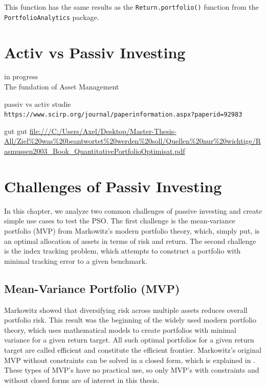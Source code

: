 \documentclass[
  oneside]{book}
\begin{document}
This function has the same results as the \texttt{Return.portfolio()} function from the \texttt{PortfolioAnalytics} package.

\hypertarget{activ-vs-passiv-investing}{%
\chapter{Activ vs Passiv Investing}\label{activ-vs-passiv-investing}}

\textbar\textbar\textbar in progress\textbar\textbar\textbar{}\\
The fundation of Asset Management

passiv vs activ studie
\texttt{https://www.scirp.org/journal/paperinformation.aspx?paperid=92983}

gut gut
\url{file:///C:/Users/Axel/Desktop/Master-Thesis-All/Ziel\%20was\%20beantwortet\%20werden\%20soll/Quellen\%20nur\%20wichtige/Rasmussen2003_Book_QuantitativePortfolioOptimisat.pdf}

\hypertarget{challenges}{%
\chapter{Challenges of Passiv Investing}\label{challenges}}

In this chapter, we analyze two common challenges of passive investing and create simple use cases to test the PSO. The first challenge is the mean-variance portfolio (MVP) from Markowitz's modern portfolio theory, which, simply put, is an optimal allocation of assets in terms of risk and return. The second challenge is the index tracking problem, which attempts to construct a portfolio with minimal tracking error to a given benchmark.

\hypertarget{mean-variance-portfolio-mvp}{%
\section{Mean-Variance Portfolio (MVP)}\label{mean-variance-portfolio-mvp}}

Markowitz showed that diversifying risk across multiple assets reduces overall portfolio risk. This result was the beginning of the widely used modern portfolio theory, which uses mathematical models to create portfolios with minimal variance for a given return target. All such optimal portfolios for a given return target are called efficient and constitute the efficient frontier. Markowitz's original MVP without constraints can be solved in a closed form, which is explained in \citep{Eric2021}. These types of MVP's have no practical use, so only MVP's with constraints and without closed forms are of interest in this thesis.
\end{document}
